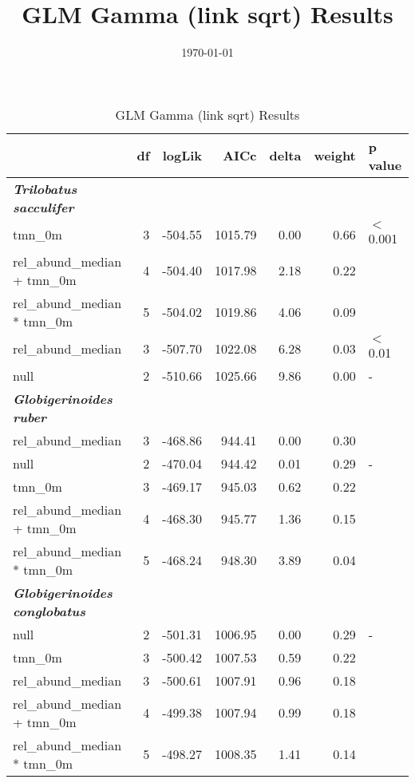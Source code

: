\documentclass[a4paper]{article}
\title{GLM  Gamma (link sqrt) Results}
\date{\today}
\begin{document}
\maketitle


\begin{table}
\label{table_glm}
\caption{GLM  Gamma (link sqrt) Results}
\footnotesize

\begin{tabular}{lrrrrrl}
  \hline
		& df & logLik & AICc & delta & weight & p value \\ 
  \hline
  
  \textbf{\textit{Trilobatus sacculifer}} &  &  &  &  &  &  \\ 
  tmn\_0m &   3 & -504.55 & 1015.79 & 0.00 & 0.66 & $<$ 0.001 \\ 
  rel\_abund\_median + tmn\_0m &   4 & -504.40 & 1017.98 & 2.18 & 0.22 &  \\ 
  rel\_abund\_median * tmn\_0m &   5 & -504.02 & 1019.86 & 4.06 & 0.09 &  \\ 
  rel\_abund\_median &   3 & -507.70 & 1022.08 & 6.28 & 0.03 & $<$ 0.01 \\ 
  null &   2 & -510.66 & 1025.66 & 9.86 & 0.00 & - \\ 
  
  \textbf{\textit{Globigerinoides ruber}} &  &  &  &  &  &  \\ 
  rel\_abund\_median &   3 & -468.86 & 944.41 & 0.00 & 0.30 &  \\ 
  null &   2 & -470.04 & 944.42 & 0.01 & 0.29 & - \\ 
  tmn\_0m &   3 & -469.17 & 945.03 & 0.62 & 0.22 &  \\ 
  rel\_abund\_median + tmn\_0m &   4 & -468.30 & 945.77 & 1.36 & 0.15 &  \\ 
  rel\_abund\_median * tmn\_0m &   5 & -468.24 & 948.30 & 3.89 & 0.04 &  \\ 
  
  \textbf{\textit{Globigerinoides conglobatus}} &  &  &  &  &  &  \\ 
  null &   2 & -501.31 & 1006.95 & 0.00 & 0.29 & - \\ 
  tmn\_0m &   3 & -500.42 & 1007.53 & 0.59 & 0.22 &  \\ 
  rel\_abund\_median &   3 & -500.61 & 1007.91 & 0.96 & 0.18 &  \\ 
  rel\_abund\_median + tmn\_0m &   4 & -499.38 & 1007.94 & 0.99 & 0.18 &  \\ 
  rel\_abund\_median * tmn\_0m &   5 & -498.27 & 1008.35 & 1.41 & 0.14 &  \\ 
  

\end{tabular}
\end{table}
\end{document}
